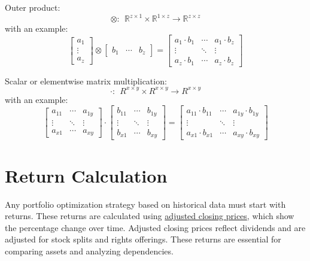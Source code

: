 \documentclass[
  oneside]{book}
\begin{document}
Outer product:
\[\otimes: \ \ \mathbb{R}^{z \times 1} \times \mathbb{R}^{1 \times z} \rightarrow \mathbb{R}^{z \times z} \]
with an example:
\[
\begin{bmatrix}a_{1}\\ \vdots \\ a_{z}\end{bmatrix}
\otimes
\begin{bmatrix}b_{1} &\cdots  & b_{z}\end{bmatrix}
=
\begin{bmatrix}a_{1} \cdot b_{1} &\cdots  & a_{1} \cdot b_{z} \\ \vdots & \ddots & \vdots  \\ a_{z} \cdot b_{1}  & \cdots & a_{z} \cdot b_{z} \end{bmatrix}
\]

Scalar or elementwise matrix multiplication:
\[\cdot: \ \ R^{x \times y} \times R^{x \times y} \rightarrow R^{x \times y}\]
with an example:
\[ 
\begin{bmatrix}a_{11} &\cdots  & a_{1y} \\ \vdots & \ddots & \vdots  \\ a_{x1} & \cdots & a_{xy} \end{bmatrix}
\cdot
\begin{bmatrix}b_{11} &\cdots  & b_{1y} \\ \vdots & \ddots & \vdots  \\ b_{x1} & \cdots & b_{xy} \end{bmatrix}
=
\begin{bmatrix}a_{11} \cdot b_{11} &\cdots  & a_{1y} \cdot b_{1y} \\ \vdots & \ddots & \vdots  \\ a_{x1} \cdot b_{x1}  & \cdots & a_{xy} \cdot b_{xy} \end{bmatrix}
\]

\hypertarget{return-calculation}{%
\section{Return Calculation}\label{return-calculation}}

Any portfolio optimization strategy based on historical data must start with returns. These returns are calculated using \href{https://www.investopedia.com/terms/a/adjusted\%20closingprice.asp}{adjusted closing prices}, which show the percentage change over time. Adjusted closing prices reflect dividends and are adjusted for stock splits and rights offerings. These returns are essential for comparing assets and analyzing dependencies.
\end{document}
